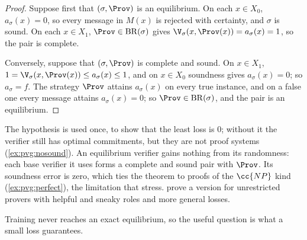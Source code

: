 \begin{refsection}
\begin{proof}
Suppose first that $(\sigma,\Prov)$ is an equilibrium. On each $x\in X_0$, $a_\sigma(x)=0$, so every message in $M(x)$ is rejected with certainty, and $\sigma$ is sound. On each $x\in X_1$, $\Prov\in\pvgBR(\sigma)$ gives $\V_\sigma(x,\Prov(x))=a_\sigma(x)=1$, so the pair is complete.

Conversely, suppose that $(\sigma,\Prov)$ is complete and sound. On $x\in X_1$, $1=\V_\sigma(x,\Prov(x))\le a_\sigma(x)\le1$, and on $x\in X_0$ soundness gives $a_\sigma(x)=0$; so $a_\sigma=f$. The strategy $\Prov$ attains $a_\sigma(x)$ on every true instance, and on a false one every message attains $a_\sigma(x)=0$; so $\Prov\in\pvgBR(\sigma)$, and the pair is an equilibrium.
\end{proof}

The hypothesis is used once, to show that the least loss is $0$; without it the verifier still has optimal commitments, but they are not proof systems (\cref{ex:pvg:nosound}). An equilibrium verifier gains nothing from its randomness: each base verifier it uses forms a complete and sound pair with $\Prov$. Its soundness error is zero, which ties the theorem to proofs of the $\cc{NP}$ kind (\cref{ex:pvg:perfect}), the limitation that \textcite[Appendices~B and~C.1]{HammondAdamDay2025} stress. \Textcite[Theorem~1]{KirchnerEtAl2024} prove a version for unrestricted provers with helpful and sneaky roles and more general losses.

Training never reaches an exact equilibrium, so the useful question is what a small loss guarantees.



\end{refsection}
